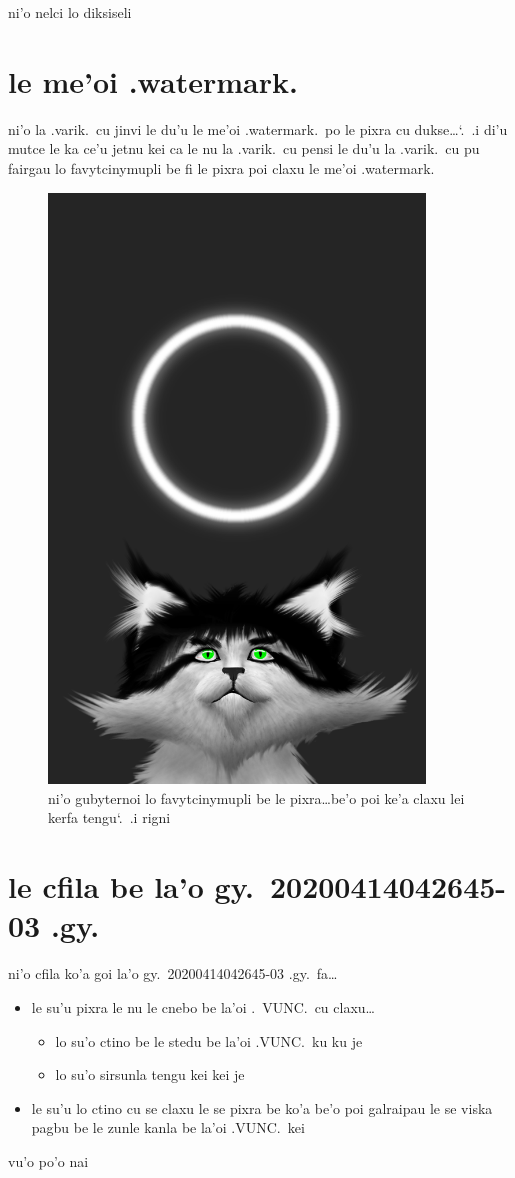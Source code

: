 \documentclass{report}
\newcommand\sds{\spacefactor\sfcode`.\ \space}
\begin{document}
ni'o nelci lo diksiseli

\section{le me'oi .watermark.}
ni'o la .varik.\ cu jinvi le du'u le me'oi .watermark.\ po le pixra cu dukse\ldots\sds  .i di'u mutce le ka ce'u jetnu kei ca le nu la .varik.\ cu pensi le du'u la .varik.\ cu pu fairgau lo favytcinymupli be fi le pixra poi claxu le me'oi .watermark.

\begin{figure}[ht]
	\centering
	\includegraphics[width=10cm]{20200414042645-03/20200414042645-03-uw.png}
	\caption[center]{ni'o gubyternoi lo favytcinymupli be le pixra\ldots be'o poi ke'a claxu lei kerfa tengu\sds  .i rigni}
\end{figure}

\section{le cfila be la'o gy.\ 20200414042645-03 .gy.}
ni'o cfila ko'a goi la'o gy.\ 20200414042645-03 .gy.\ fa\ldots
\begin{itemize}
	\item le su'u pixra le nu le cnebo be la'oi .\ VUNC.\ cu claxu\ldots
	\begin{itemize}
		\item lo su'o ctino be le stedu be la'oi .VUNC.\ ku ku je
		\item lo su'o sirsunla tengu kei kei je
	\end{itemize}
	\item le su'u lo ctino cu se claxu le se pixra be ko'a be'o poi galraipau le se viska pagbu be le zunle kanla be la'oi .VUNC.\ kei
\end{itemize}
vu'o po'o nai
\end{document}
